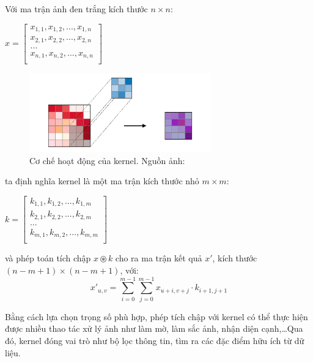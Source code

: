 \documentclass[12pt]{extreport}
\begin{document}
Với ma trận ảnh đen trắng kích thước $ n \times n $:
\begin{center}
    \begin{math}
        x = \begin{bmatrix}
            x_{1,1}, x_{1,2},..., x_{1,n} \\
            x_{2,1}, x_{2,2},..., x_{2,n} \\
            ...                           \\
            x_{n,1}, x_{n,2},..., x_{n,n} \\
        \end{bmatrix}
    \end{math}
\end{center}
\begin{figure}[H]
    \centering
    \includegraphics[width=0.7\textwidth]{figure6}
    \caption{Cơ chế hoạt động của kernel. Nguồn ảnh: \cite{CS230}}
\end{figure}
ta định nghĩa kernel là một ma trận kích thước nhỏ $ m \times m $:
\begin{center}
    \begin{math}
        k = \begin{bmatrix}
            k_{1,1}, k_{1,2},..., k_{1,m} \\
            k_{2,1}, k_{2,2},..., k_{2,m} \\
            ...                           \\
            k_{m,1}, k_{m,2},..., k_{m,m} \\
        \end{bmatrix}
    \end{math}
\end{center}
và phép toán tích chập $ x \circledast k $ cho ra ma trận kết quả $ x' $, kích thước $ (n - m + 1) \times (n - m + 1) $, với:
$$ x'_{u,v} = \sum_{i=0}^{m-1} \sum_{j=0}^{m-1} x_{u+i,v+j} \cdot k_{i+1,j+1} $$

Bằng cách lựa chọn trọng số phù hợp, phép tích chập với kernel có thể thực hiện được nhiều thao tác xử lý ảnh như làm mờ, làm sắc ảnh, nhận diện cạnh,\dots Qua đó, kernel đóng vai trò như bộ lọc thông tin, tìm ra các đặc điểm hữu ích từ dữ liệu.
\end{document}
